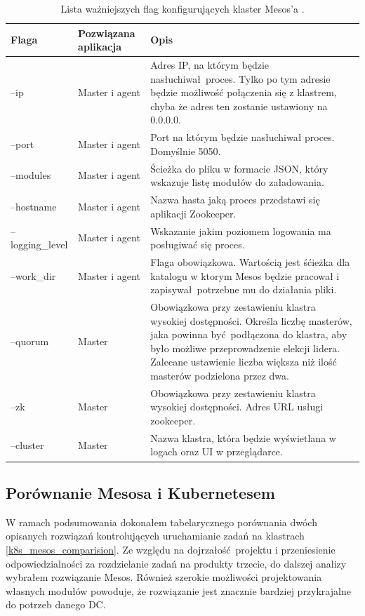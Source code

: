 \documentclass[10pt,a4paper,titlepage,twoside]{report}
\begin{document}
\begin{table}[!htbp]
\caption{Lista ważniejszych flag konfigurujących klaster Mesos'a \cite{ad34}.}
\label{mesos_flags}
\centering
\begin{tabular}{|p{3cm}|p{3cm}|p{8cm}|}
  \hline
  \textbf{Flaga} & \textbf{Pozwiązana aplikacja} & \textbf{Opis}\\
  \hline
  --ip & Master i agent & Adres IP, na którym będzie nasłuchiwał proces. Tylko po tym adresie będzie możliwość połączenia się z klastrem, chyba że adres ten zostanie ustawiony na 0.0.0.0. \\
  \hline
  --port & Master i agent & Port na którym będzie nasłuchiwał proces. Domyślnie 5050. \\
  \hline
  --modules & Master i agent & Ścieżka do pliku w formacie JSON, który wskazuje listę modułów do załadowania. \\
  \hline
  --hostname & Master i agent & Nazwa hasta jaką proces przedstawi się aplikacji Zookeeper. \\
  \hline
  --logging\_level & Master i agent & Wskazanie jakim poziomem logowania ma posługiwać się proces.  \\
  \hline
  --work\_dir & Master i agent & Flaga obowiązkowa. Wartością jest śćieżka dla katalogu w ktorym Mesos będzie pracował i zapisywał potrzebne mu do działania pliki. \\
  \hline
  --quorum & Master & Obowiązkowa przy zestawieniu klastra wysokiej dostępności. Określa liczbę masterów, jaka powinna być podłączona do klastra, aby było możliwe przeprowadzenie elekcji lidera. Zalecane ustawienie liczba większa niż ilość masterów podzielona przez dwa. \\
  \hline
  --zk & Master & Obowiązkowa przy zestawieniu klastra wysokiej dostępności. Adres URL usługi zookeeper. \\
  \hline
  --cluster & Master & Nazwa klastra, która będzie wyświetlana w logach oraz UI w przeglądarce. \\
  \hline
\end{tabular}
\end{table}

\subsection{Porównanie Mesosa i Kubernetesem}
W ramach podsumowania dokonałem tabelarycznego porównania dwóch opisanych rozwiązań kontrolujących uruchamianie zadań na klastrach \ref{k8s_mesos_comparision}. Ze względu na dojrzałość projektu i przeniesienie odpowiedzialności za rozdzielanie zadań na produkty trzecie, do dalszej analizy wybrałem rozwiązanie Mesos. Również szerokie możliwości projektowania własnych modułów powoduje, że rozwiązanie jest znacznie bardziej przykrajalne do potrzeb danego DC.
\end{document}
